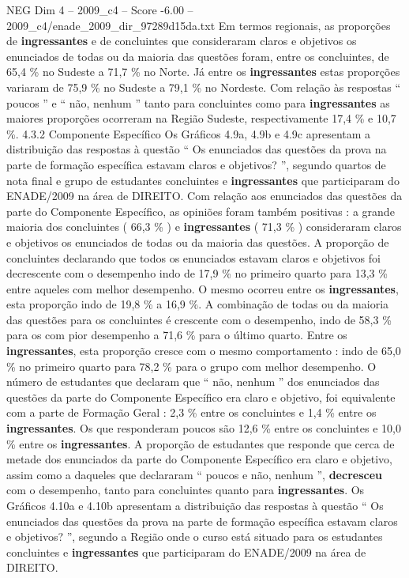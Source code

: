 \begin{textsample}{NEG Dim 4 – 2009\_c4 – Score -6.00 – 2009\_c4/enade\_2009\_dir\_97289d15da.txt}
Em termos regionais, as proporções de \textbf{ingressantes} e de concluintes que consideraram claros e objetivos os enunciados de todas ou da maioria das questões foram, entre os concluintes, de 65,4 \% no Sudeste a 71,7 \% no Norte.
Já entre os \textbf{ingressantes} estas proporções variaram de 75,9 \% no Sudeste a 79,1 \% no Nordeste.
Com relação às respostas “ poucos ” e “ não, nenhum ” tanto para concluintes como para \textbf{ingressantes} as maiores proporções ocorreram na Região Sudeste, respectivamente 17,4 \% e 10,7 \%. 4.3.2 Componente Específico Os Gráficos 4.9a, 4.9b e 4.9c apresentam a distribuição das respostas à questão “ Os enunciados das questões da prova na parte de formação específica estavam claros e objetivos? ”, segundo quartos de nota final e grupo de estudantes concluintes e \textbf{ingressantes} que participaram do ENADE/2009 na área de DIREITO.
Com relação aos enunciados das questões da parte do Componente Específico, as opiniões foram também positivas : a grande maioria dos concluintes ( 66,3 \% ) e \textbf{ingressantes} ( 71,3 \% ) consideraram claros e objetivos os enunciados de todas ou da maioria das questões.
A proporção de concluintes declarando que todos os enunciados estavam claros e objetivos foi decrescente com o desempenho indo de 17,9 \% no primeiro quarto para 13,3 \% entre aqueles com melhor desempenho.
O mesmo ocorreu entre os \textbf{ingressantes}, esta proporção indo de 19,8 \% a 16,9 \%.
A combinação de todas ou da maioria das questões para os concluintes é crescente com o desempenho, indo de 58,3 \% para os com pior desempenho a 71,6 \% para o último quarto.
Entre os \textbf{ingressantes}, esta proporção cresce com o mesmo comportamento : indo de 65,0 \% no primeiro quarto para 78,2 \% para o grupo com melhor desempenho.
O número de estudantes que declaram que “ não, nenhum ” dos enunciados das questões da parte do Componente Específico era claro e objetivo, foi equivalente com a parte de Formação Geral : 2,3 \% entre os concluintes e 1,4 \% entre os \textbf{ingressantes}.
Os que responderam poucos são 12,6 \% entre os concluintes e 10,0 \% entre os \textbf{ingressantes}.
A proporção de estudantes que responde que cerca de metade dos enunciados da parte do Componente Específico era claro e objetivo, assim como a daqueles que declararam “ poucos e não, nenhum ”, \textbf{decresceu} com o desempenho, tanto para concluintes quanto para \textbf{ingressantes}.
Os Gráficos 4.10a e 4.10b apresentam a distribuição das respostas à questão “ Os enunciados das questões da prova na parte de formação específica estavam claros e objetivos? ”, segundo a Região onde o curso está situado para os estudantes concluintes e \textbf{ingressantes} que participaram do ENADE/2009 na área de DIREITO.

\end{textsample}
